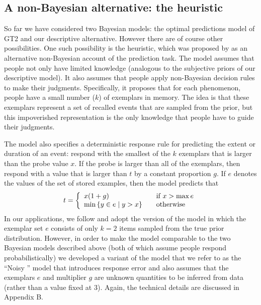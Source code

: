 \subsection*{A non-Bayesian alternative: the \mink heuristic}

So far we have considered two Bayesian models: the optimal predictions model of GT2 and our descriptive alternative. However there are of course other possibilities. One such possibility is the \mink heuristic, which was proposed by  as an alternative non-Bayesian account of the prediction task. The model assumes that people not only have limited knowledge (analogous to the subjective priors of our descriptive model). It also assumes that people apply non-Bayesian decision rules to make their judgments. Specifically, it proposes that for each phenomenon, people have a small number ($k$) of exemplars in memory. The idea is that these exemplars represent a set of recalled events that are sampled from the prior, but this impoverished representation is the only knowledge that people have to guide their judgments. 

The \mink model also specifies a deterministic response rule for predicting the extent or duration of an event: respond with the smallest of the $k$ exemplars that is larger than the probe value $x$. If the probe is larger than all of the exemplars, then respond with a value that is larger than $t$ by a constant proportion $g$. If $e$ denotes the values of the set of stored examples, then the \mink model predicts that
\begin{equation}
t =
\left\{
\begin{array}{l l}
	x(1+g) & \quad \text{if } x>\max{e}\\
	\min{\left\{{y \in e \mid y>x}\right\}} & \quad \text{otherwise}\\
\end{array} \right.
\end{equation}
In our applications, we follow  and adopt the version of the model in which the exemplar set $e$ consists of only $k=2$ items sampled from the true prior distribution. However, in order to make the model comparable to the two Bayesian models described above (both of which assume people respond probabilistically) we developed a variant of the model that we refer to as the ``Noisy \mink'' model that introduces response error and also assumes that the exemplars $e$ and multiplier $g$ are unknown quantities to be inferred from data (rather than a value fixed at 3). Again, the technical details are discussed in Appendix B.

